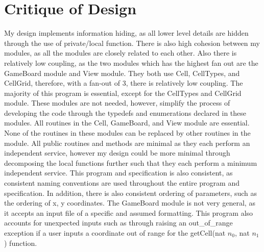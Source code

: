 \documentclass[12pt]{article}
\begin{document}
\section*{Critique of Design}
My design implements information hiding, as all lower level details are hidden through the use of private/local function. There is also high cohesion between my modules, as all the modules are closely related to each other. Also there is relatively low coupling, as the two modules which has the highest fan out are the GameBoard module and View module. They both use Cell, CellTypes, and CellGrid, therefore, with a fan-out of 3, there is relatively low coupling. The majority of this program is essential, except for the CellTypes and CellGrid module. These modules are not needed, however, simplify the process of developing the code through the typedefs and enumerations declared in these modules. All routines in the Cell, GameBoard, and View module are essential. None of the routines in these modules can be replaced by other routines in the module. All public routines and methods are minimal as they each perform an independent service, however my design could be more minimal through decomposing the local functions further such that they each perform a minimum independent service. This program and specification is also consistent, as consistent naming conventions are used throughout the entire program and specification. In addition, there is also consistent ordering of parameters, such as the ordering of x, y coordinates. The GameBoard module is not very general, as it accepts an input file of a specific and assumed formatting. This program also accounts for unexpected inputs such as through raising an out\_of\_range exception if a user inputs a coordinate out of range for the getCell(nat $n_0$, nat $n_1$) function. 
\end{document}
